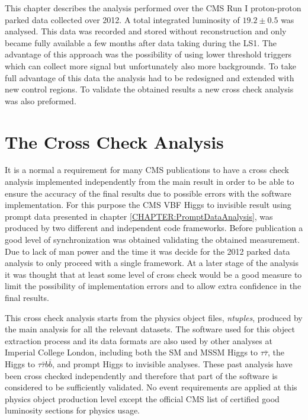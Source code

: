 This chapter describes the analysis performed over the \gls{CMS} Run I proton-proton parked data collected over 2012. A total integrated luminosity of $19.2 \pm 0.5$ was analysed. This data was recorded and stored without reconstruction and only became fully available a few months after data taking during the \gls{LS1}. The advantage of this approach was the possibility of using lower threshold triggers which can collect more signal but unfortunately also more backgrounds. To take full advantage of this data the analysis had to be redesigned and extended with new control regions. To validate the obtained results a new cross check analysis was also preformed.

\section{The Cross Check Analysis}
\label{CHAPTER:ParkedDataAnalysis_CrossCheckAnalysis}


It is a normal a requirement for many \gls{CMS} publications to have a cross check analysis implemented independently from the main result in order to be able to ensure the accuracy of the final results due to possible errors with the software implementation. For this purpose the \gls{CMS} \gls{VBF} Higgs to invisible result using prompt data presented in chapter \ref{CHAPTER:PromptDataAnalysis}, was produced by two different and independent code frameworks. Before publication a good level of synchronization was obtained validating the obtained measurement. Due to lack of man power and the time it was decide for the 2012 parked data analysis to only proceed with a single framework. At a later stage of the analysis it was thought that at least some level of cross check would be a good measure to limit the possibility of implementation errors and to allow extra confidence in the final results.
 
This cross check analysis starts from the physics object files, \textit{ntuples}, produced by the main analysis for all the relevant datasets. The software used for this object extraction process and its data formats are also used by other analyses at Imperial College London, including both the \gls{SM} and \gls{MSSM} Higgs to $\tau\bar{\tau}$, the Higgs to $\tau\bar{\tau}b\bar{b}$, and prompt Higgs to invisible analyses. These past analysis have been cross checked independently and therefore that part of the software is considered to be sufficiently validated. No event requirements are applied at this physics object production level except the official \gls{CMS} list of certified good luminosity sections for physics usage.
 
